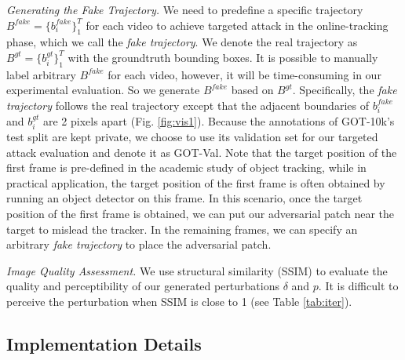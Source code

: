 \documentclass[journal]{IEEEtran}
\begin{document}
\textit{Generating the Fake Trajectory.} We need to predefine a specific trajectory $B^{fake}=\{b^{fake}_i\}_1^{T}$ for each video to achieve targeted attack in the online-tracking phase, which we call the \textit{fake trajectory}. We denote the real trajectory as $B^{gt}=\{b^{gt}_i\}_1^T$ with the groundtruth bounding boxes.
It is possible to manually label arbitrary $B^{fake}$ for each video, however, it will be time-consuming in our experimental evaluation. So we generate $B^{fake}$ based on $B^{gt}$. Specifically, the \textit{fake trajectory} follows the real trajectory except that the adjacent boundaries of $b^{fake}_i$ and $b^{gt}_i$ are 2 pixels apart (Fig. \ref{fig:vis1}).
Because the annotations of GOT-10k's test split are kept private, we choose to use its validation set for our targeted attack evaluation and denote it as GOT-Val. Note that the target position of the first frame is pre-defined in the academic study of object tracking, while in practical application, the target position of the first frame is often obtained by running an object detector on this frame. In this scenario, once the target position of the first frame is obtained, we can put our adversarial patch near the target to mislead the tracker. In the remaining frames, we can specify an arbitrary \textit{fake trajectory} to place the adversarial patch.

\textit{Image Quality Assessment.} We use structural similarity (SSIM) \cite{SSIM} to evaluate the quality and perceptibility of our generated perturbations $\delta$ and $p$. It is difficult to perceive the perturbation when SSIM is close to 1 (see Table \ref{tab:iter}).

\subsection{Implementation Details}
\end{document}
